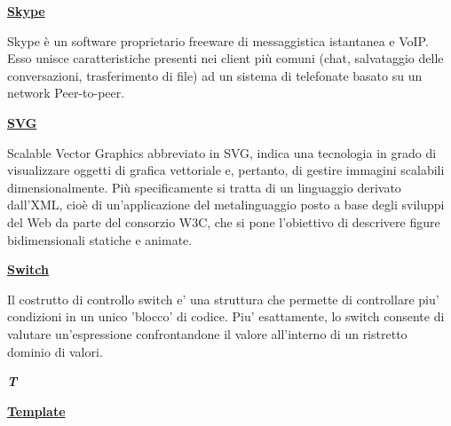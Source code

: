 \bigskip
\begin{addmargin}[0em]{0em}		
	\textbf{\underline{Skype}}
\end{addmargin}
	 
\medskip
\begin{addmargin}[5em]{1em}	
Skype è un software proprietario freeware di messaggistica istantanea e VoIP. Esso unisce caratteristiche presenti nei client più comuni (chat, salvataggio delle conversazioni, trasferimento di file) ad un sistema di telefonate basato su un network Peer-to-peer.  
\end{addmargin}	

\bigskip
\begin{addmargin}[0em]{0em}		
	\textbf{\underline{SVG}}
	\end{addmargin} 
	
\medskip
\begin{addmargin}[5em]{1em}	
Scalable Vector Graphics abbreviato in SVG, indica una tecnologia in grado di visualizzare oggetti di grafica vettoriale e, pertanto, di gestire immagini scalabili dimensionalmente.
Più specificamente si tratta di un linguaggio derivato dall'XML, cioè di un'applicazione del metalinguaggio posto a base degli sviluppi del Web da parte del consorzio W3C, che si pone l'obiettivo di descrivere figure bidimensionali statiche e animate.
\end{addmargin}	

\bigskip
\begin{addmargin}[0em]{0em}		
	\textbf{\underline{Switch}}
	\end{addmargin} 
	
\medskip
\begin{addmargin}[5em]{1em}	
Il costrutto di controllo switch e' una struttura che permette di controllare piu' condizioni in un unico 'blocco' di codice. Piu' esattamente, lo switch consente di valutare un'espressione confrontandone il valore all'interno di un ristretto dominio di valori.
\end{addmargin}	

\newpage
	
\cleardoublepage
{}
{}
\noindent\hrulefill\hspace{4mm}\textbf{\textsl{\Huge{T}}}\hspace{4mm}\hrulefill

\vspace*{2\bigskipamount}	

\begin{addmargin}[0em]{0em}		
	\textbf{\underline{Template}}
	\end{addmargin}
	 
